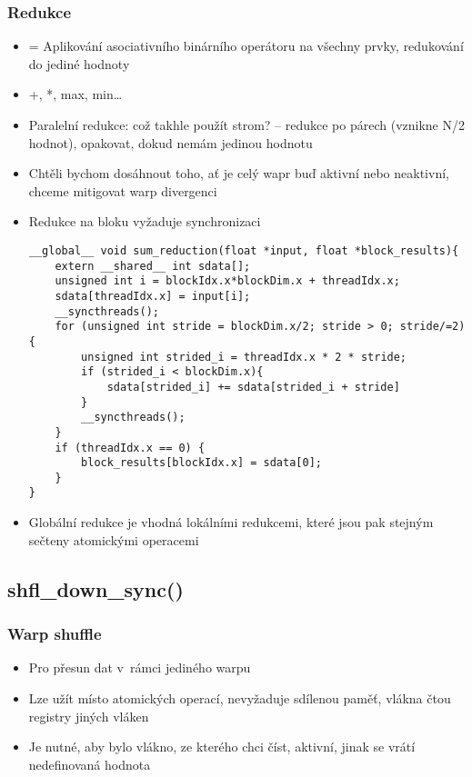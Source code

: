 \subsubsection{Redukce}
\begin{itemize}
    \item = Aplikování asociativního binárního operátoru na všechny prvky, redukování do jediné hodnoty
    \item +, *, max, min\dots
    \item Paralelní redukce: což takhle použít strom? -- redukce po párech (vznikne N/2 hodnot), opakovat, dokud nemám jedinou hodnotu
    \item Chtěli bychom dosáhnout toho, ať je celý wapr buď aktivní nebo neaktivní, chceme mitigovat warp divergenci
    \item Redukce na bloku vyžaduje synchronizaci
    \begin{verbatim}
__global__ void sum_reduction(float *input, float *block_results){
    extern __shared__ int sdata[];
    unsigned int i = blockIdx.x*blockDim.x + threadIdx.x;
    sdata[threadIdx.x] = input[i];
    __syncthreads();
    for (unsigned int stride = blockDim.x/2; stride > 0; stride/=2){
        unsigned int strided_i = threadIdx.x * 2 * stride;
        if (strided_i < blockDim.x){
            sdata[strided_i] += sdata[strided_i + stride]
        }
        __syncthreads();
    }
    if (threadIdx.x == 0) {
        block_results[blockIdx.x] = sdata[0];
    }
}
    \end{verbatim}
    \item Globální redukce je vhodná lokálními redukcemi, které jsou pak stejným sečteny atomickými operacemi
\end{itemize}

\subsection{shfl\_down\_sync()}
\subsubsection{Warp shuffle}
\begin{itemize}
    \item Pro přesun dat v~rámci jediného warpu
    \item Lze užít místo atomických operací, nevyžaduje sdílenou paměť, vlákna čtou registry jiných vláken
    \item Je nutné, aby bylo vlákno, ze kterého chci číst, aktivní, jinak se vrátí nedefinovaná hodnota
\end{itemize}
